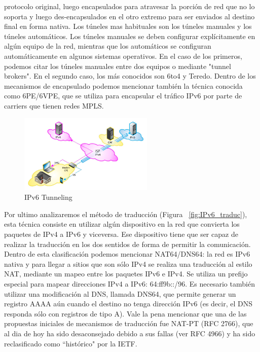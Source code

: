 \documentclass[11pt,a4paper]{article}
\begin{document}
protocolo original, luego encapsulados para atravesar la porción de red que no lo soporta y luego 
des-encapsulados en el otro extremo para ser enviados al destino final en forma nativa.
Los túneles mas habituales son los túneles manuales y los túneles automáticos. Los túneles manuales 
se deben configurar explícitamente en algún equipo de la red, mientras que los automáticos se 
configuran automáticamente en algunos sistemas operativos. En el caso de los primeros, podemos citar 
los túneles manuales entre dos equipos o mediante "tunnel brokers". En el segundo caso, los más 
conocidos son 6to4 y Teredo.
Dentro de los mecanismos de encapsulado podemos mencionar también la técnica conocida como 6PE/6VPE, 
que se utiliza para encapsular el tráfico IPv6 por parte de carriers que tienen redes MPLS.
\begin{figure}[h!]
 \centering
 \includegraphics[width=0.57\textwidth]{ipv6_tunnel.jpg}
 \caption[IPv6 Tunneling]{IPv6 Tunneling}
 \label{fig:IPv6_Tunneling}
\end{figure}\par
Por ultimo analizaremos el método de traducción (Figura ~\ref{fig:IPv6_traduc}), esta técnica 
consiste en utilizar algún dispositivo en la red que convierta los paquetes de IPv4 a IPv6 y 
viceversa. Ese dispositivo tiene que ser capaz de realizar la traducción en los dos sentidos de 
forma de permitir la comunicación. Dentro de esta clasificación podemos mencionar NAT64/DNS64: la 
red es IPv6 nativa y para llegar a sitios que son sólo IPv4 se realiza una traducción al estilo NAT, 
mediante un mapeo entre los paquetes IPv6 e IPv4. Se utiliza un prefijo especial para mapear 
direcciones IPv4 a IPv6: 64:ff9b::/96. Es necesario también utilizar una modificación al DNS, 
llamada DNS64, que permite generar un registro AAAA aún cuando el destino no tenga dirección IPv6 
(es decir, el DNS responda sólo con registros de tipo A). Vale la pena mencionar que una de las 
propuestas iniciales de mecanismos de traducción fue NAT-PT (RFC 2766), que al dia de hoy ha sido 
desaconsejado debido a sus fallas (ver RFC 4966) y ha sido reclasificado como ``histórico" por la 
IETF.
\end{document}
